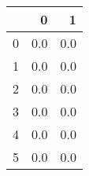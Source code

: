 \begin{tabular}{lrr}
\toprule
{} &    0 &    1 \\
\midrule
0 &  0.0 &  0.0 \\
1 &  0.0 &  0.0 \\
2 &  0.0 &  0.0 \\
3 &  0.0 &  0.0 \\
4 &  0.0 &  0.0 \\
5 &  0.0 &  0.0 \\
\bottomrule
\end{tabular}
